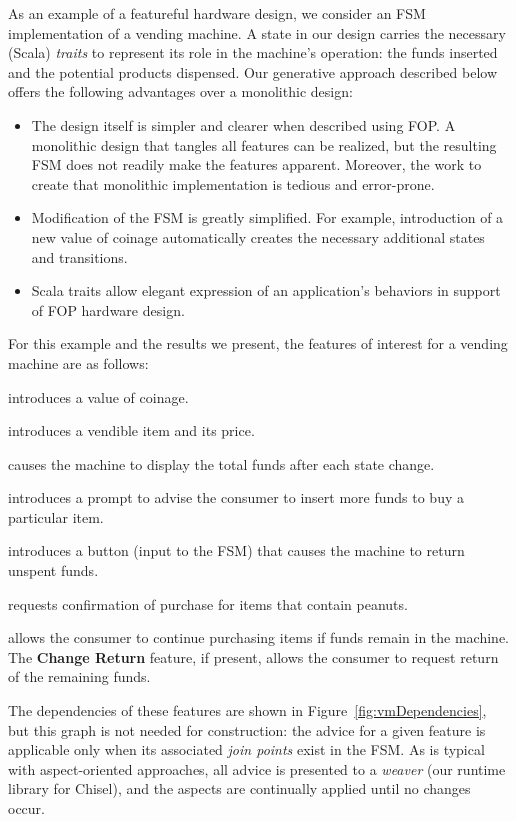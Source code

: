 \documentclass[conference]{IEEEtran}
\begin{document}
As an example of a featureful hardware design, we consider an FSM implementation of a vending machine.   A state in our design carries the necessary (Scala) \emph{traits} to represent its role in the machine's operation:  the funds inserted and the potential products dispensed.  Our generative approach described below offers the following advantages over a monolithic design:
\begin{itemize}
    \item The design itself is simpler and clearer when described using FOP.  A monolithic design that tangles all features can be realized, but the resulting FSM does not readily make the features apparent.  Moreover, the work to create that monolithic implementation is tedious and error-prone.
    \item Modification of the FSM is greatly simplified.  For example, introduction of a new value of coinage automatically creates the necessary additional states and transitions.
    \item Scala traits allow elegant expression of an application's behaviors in support of FOP hardware design.
\end{itemize}
For this example and the results we present, the features of interest for a vending machine are as follows:
\begin{description}
    \item[Add Currency] introduces a value of coinage.
    \item[Dispense Product] introduces a vendible item and its price.
    \item[Print Funds] causes the machine to display the total funds after each state change.
    \item[Insufficient Funds] introduces a prompt to advise the consumer to insert more funds to buy a particular item.
    \item[Change Return] introduces a button (input to the FSM) that causes the machine to return unspent funds.
    \item[Peanut Warning] requests confirmation of purchase for items that contain peanuts.
    \item[Buy More] allows the consumer to continue purchasing items if funds remain in the machine.  The \textbf{Change Return} feature, if present, allows the consumer to request return of the remaining funds.
\end{description}
The dependencies of these features are shown in Figure~\ref{fig:vmDependencies}, but this graph is not needed for construction:  the advice for a given feature is applicable only when its associated \emph{join points} exist in the FSM.  As is typical with aspect-oriented approaches, all advice is presented to a \emph{weaver} (our runtime library for Chisel), and the aspects are continually applied until no changes occur.
\end{document}
